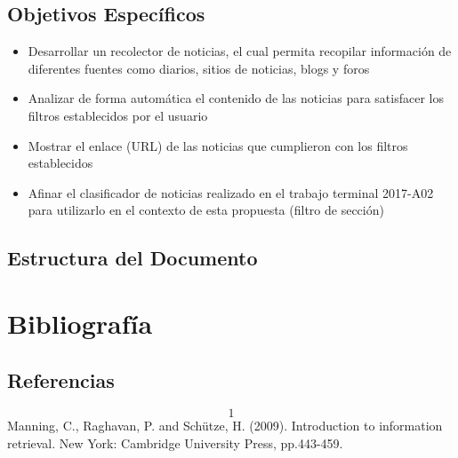 \documentclass{book}
\begin{document}
\section{Objetivos Específicos}
\begin{itemize}
  \item Desarrollar un recolector de noticias, el cual permita recopilar información de diferentes fuentes como diarios, sitios de noticias, blogs y foros
  \item Analizar de forma automática el contenido de las noticias para satisfacer los filtros establecidos por el usuario
  \item Mostrar el enlace (URL) de las noticias que cumplieron con los filtros establecidos
  \item Afinar el clasificador de noticias realizado en el trabajo terminal 2017-A02 para utilizarlo en el contexto de esta propuesta (filtro de sección) 

\end{itemize}
\section{Estructura del Documento}




\chapter{Bibliografía}\label{chp:introduccion}
\section{Referencias}
\[1\] Manning, C., Raghavan, P. and Schütze, H. (2009). Introduction to information retrieval. New York: Cambridge University Press, pp.443-459.
\end{document}
